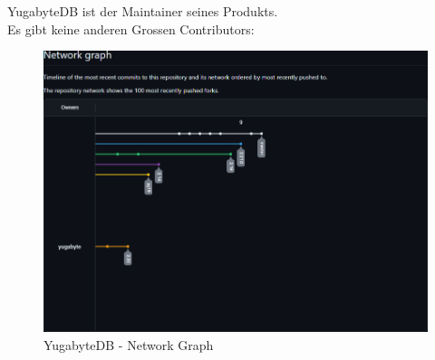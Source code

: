 \begin{flushleft}
    YugabyteDB ist der Maintainer seines Produkts.\\
    Es gibt keine anderen Grossen Contributors:
     \begin{figure}[H]
        \centering
        \includegraphics[width=0.75\linewidth]{source/implementation/evaluation/postgresql_ha_solutions/insights/yugabytedb/network_graph_yugabyte_yugabyte-db}
        \caption{YugabyteDB - Network Graph}
        \label{fig:network_graph_yugabyte_yugabyte-db}
    \end{figure}
\end{flushleft}